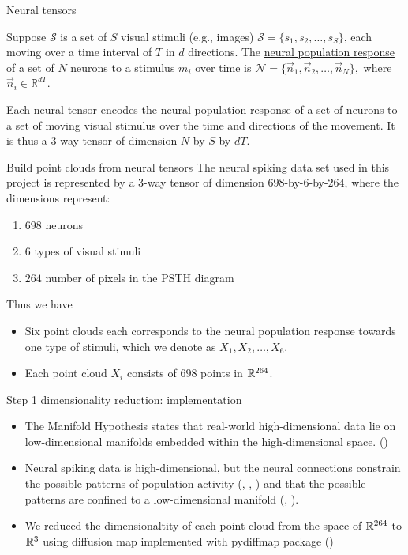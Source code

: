 \documentclass[xcolor={dvipsnames,svgnames}]{beamer}
\begin{document}
\begin{frame}{Neural tensors}
\begin{defn}
    Suppose $\mathcal{S}$ is a set of $S$ visual stimuli (e.g., images) $\mathcal{S} = \{s_1, s_2,\dots, s_S\}$, each moving over a time interval of $T$ in $d$ directions. The \underline{neural population response} of a set of $N$ neurons to a stimulus $m_i$ over time is $\mathcal{N} = \{\vec{n}_1, \vec{n}_2, \dots, \vec{n}_N\},$ where $\vec{n}_i \in \mathbb{R}^{dT}$. 
\end{defn}
\begin{defn}
    Each \underline{neural tensor} encodes the neural population response of a set of neurons to a set of moving visual stimulus over the time and directions of the movement. It is thus a $3$-way tensor of dimension $N$-by-$S$-by-$dT$.
\end{defn}
\end{frame}
\begin{frame}{Build point clouds from neural tensors}
The neural spiking data set used in this project is represented by a $3$-way tensor of dimension $698$-by-$6$-by-$264$, where the dimensions represent: 
\begin{enumerate}
    \item $698$ neurons 
    \item $6$ types of visual stimuli
    \item $264$ number of pixels in the PSTH diagram
\end{enumerate}

Thus we have
\begin{itemize}
    \item Six point clouds each corresponds to the neural population response towards one type of stimuli, which we denote as $X_1, X_2, \dots,X_6$.
    \item Each point cloud $X_i$ consists of $698$ points in $\mathbb R^{264}$. 
\end{itemize}
\end{frame}

\begin{frame}{Step 1 dimensionality reduction: implementation}
    
    \begin{itemize}
        \item The Manifold Hypothesis states that real-world high-dimensional data lie on low-dimensional manifolds embedded within the high-dimensional space. (\cite{deepai_2019})
        \item  Neural spiking data is high-dimensional, but the neural connections constrain the possible patterns of population activity (\cite{okun_diverse_2015}, \cite{sadtler_neural_2014}, \cite{tsodyks_attractor_1999}) and that the possible patterns are confined to a low-dimensional manifold (\cite{stopfer_intensity_2003},  \cite{yu_gaussian-process_2009}).
        \item We reduced the dimensionaltity of each point cloud from the space of $\mathbb R^{264}$ to $\mathbb R^3$ using diffusion map implemented with pydiffmap package (\cite{eastman_pydiffmap_2017})
    \end{itemize}
    \end{frame}
    
\end{document}
